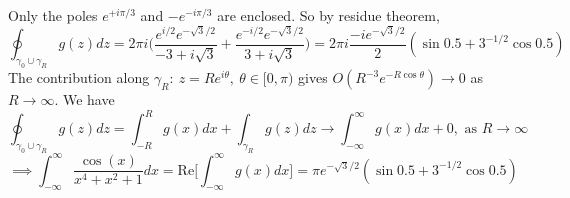 \documentclass[a4paper]{article}
\begin{document}
\begin{ans}
\begin{enumerate}[label=(\alph*)]
\begin{center}
  \end{center}
Only the poles $e^{+i\pi/3}$ and $-e^{-i\pi/3}$ are enclosed. So by residue theorem,
$$\oint_{\gamma_0\cup\gamma_R}g(z)dz=2\pi i\bigg(\frac{e^{i/2}e^{-\sqrt{3}/2}}{-3+i\sqrt{3}}+\frac{e^{-i/2}e^{-\sqrt{3}/2}}{3+i\sqrt{3}}\bigg)=2\pi i\frac{-ie^{-\sqrt{3}/2}}{2}(\sin0.5+3^{-1/2}\cos0.5)$$
The contribution along $\gamma_R:~z=Re^{i\theta},~\theta\in[0,\pi)$ gives $O(R^{-3}e^{-R\cos\theta})\rightarrow0$ as $R\rightarrow\infty$. We have
$$\oint_{\gamma_0\cup\gamma_R}g(z)dz=\int_{-R}^R g(x)dx+\int_{\gamma_R}g(z)dz\rightarrow\int_{-\infty}^\infty g(x)dx+0,\text{ as }R\rightarrow\infty$$
$$\implies\int_{-\infty}^\infty\frac{\cos(x)}{x^4+x^2+1}dx=\text{Re}\bigg[\int_{-\infty}^\infty g(x)dx\bigg]=\pi e^{-\sqrt{3}/2}(\sin 0.5+3^{-1/2}\cos0.5)$$
\end{enumerate}
\end{ans}
\newpage
\end{document}
